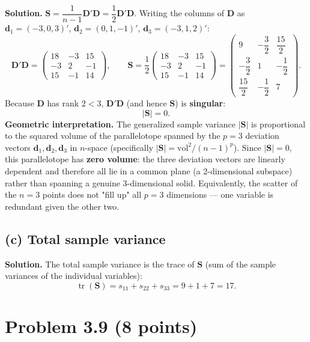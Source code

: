 \documentclass[11pt]{article}
\newcommand{\bS}{\mathbf{S}}
\newcommand{\bd}{\mathbf{d}}
\newcommand{\bD}{\mathbf{D}}
\newenvironment{sol}{\par\noindent\textbf{Solution.}\quad}{\par\medskip}
\begin{document}
\begin{sol}
$\bS = \dfrac{1}{n-1}\bD'\bD = \dfrac12 \bD'\bD$. Writing the columns of $\bD$ as $\bd_1=(-3,0,3)'$, $\bd_2=(0,1,-1)'$, $\bd_3=(-3,1,2)'$:
\[
\bD'\bD = \begin{pmatrix} 18 & -3 & 15\\ -3 & 2 & -1 \\ 15 & -1 & 14\end{pmatrix}, \qquad
\bS = \frac12\begin{pmatrix} 18 & -3 & 15\\ -3 & 2 & -1 \\ 15 & -1 & 14\end{pmatrix}
= \begin{pmatrix} 9 & -\dfrac32 & \dfrac{15}{2} \\[4pt] -\dfrac32 & 1 & -\dfrac12 \\[4pt] \dfrac{15}{2} & -\dfrac12 & 7\end{pmatrix}.
\]
Because $\bD$ has rank $2<3$, $\bD'\bD$ (and hence $\bS$) is \textbf{singular}:
\[
|\bS| = 0.
\]
\textbf{Geometric interpretation.} The generalized sample variance $|\bS|$ is proportional to the squared volume of the parallelotope spanned by the $p=3$ deviation vectors $\bd_1,\bd_2,\bd_3$ in $n$-space (specifically $|\bS|=\text{vol}^2/(n-1)^p$). Since $|\bS|=0$, this parallelotope has \textbf{zero volume}: the three deviation vectors are linearly dependent and therefore all lie in a common plane (a 2-dimensional subspace) rather than spanning a genuine 3-dimensional solid. Equivalently, the scatter of the $n=3$ points does not "fill up" all $p=3$ dimensions — one variable is redundant given the other two.
\end{sol}

\subsection*{(c) Total sample variance}

\begin{sol}
The total sample variance is the trace of $\bS$ (sum of the sample variances of the individual variables):
\[
\operatorname{tr}(\bS) = s_{11}+s_{22}+s_{33} = 9 + 1 + 7 = \boxed{17}.
\]
\end{sol}

\clearpage
\section{Problem 3.9 (8 points)}
\end{document}
